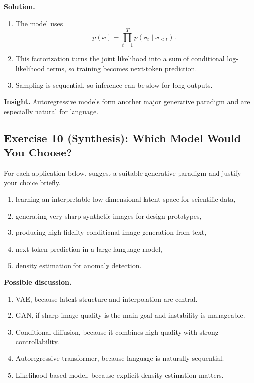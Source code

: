\medskip

\noindent
\textbf{Solution.}
\begin{enumerate}
    \item The model uses
    \[
    p(x)=\prod_{t=1}^T p(x_t\mid x_{<t}).
    \]

    \item This factorization turns the joint likelihood into a sum of conditional log-likelihood terms, so training becomes next-token prediction.

    \item Sampling is sequential, so inference can be slow for long outputs.
\end{enumerate}

\medskip

\noindent
\textbf{Insight.}  
Autoregressive models form another major generative paradigm and are especially natural for language.

\subsection{Exercise 10 (Synthesis): Which Model Would You Choose?}

For each application below, suggest a suitable generative paradigm and justify your choice briefly.

\begin{enumerate}
    \item learning an interpretable low-dimensional latent space for scientific data,
    \item generating very sharp synthetic images for design prototypes,
    \item producing high-fidelity conditional image generation from text,
    \item next-token prediction in a large language model,
    \item density estimation for anomaly detection.
\end{enumerate}

\medskip

\noindent
\textbf{Possible discussion.}

\begin{enumerate}
    \item VAE, because latent structure and interpolation are central.
    \item GAN, if sharp image quality is the main goal and instability is manageable.
    \item Conditional diffusion, because it combines high quality with strong controllability.
    \item Autoregressive transformer, because language is naturally sequential.
    \item Likelihood-based model, because explicit density estimation matters.
\end{enumerate}

